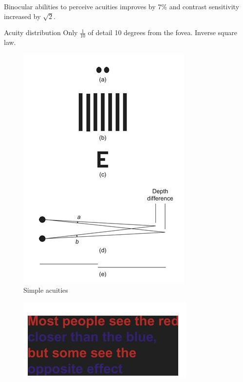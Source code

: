 \begin{mdframed}
\begin{multicols}{2}
\begin{compactdesc}
\item[Binocular abilities] to perceive acuities improves by 7\% and
    contrast sensitivity increased by $\sqrt 2$.
\item[Acuity distribution] Only $\frac{1}{10}$ of detail 10 degrees from the
    fovea. Inverse square law.
\end{compactdesc}
\end{multicols}
\end{mdframed}


\begin{mdframed}\begin{multicols}{3}
    \begin{figure}[H]
        \centering
        \includegraphics[width=0.7\linewidth]{acuities.png}
        \caption{Simple acuities}
    \end{figure}
    \begin{figure}[H]
        \centering
        \includegraphics[width=\linewidth]{red_or_blue_near.png}

\end{figure}
\end{multicols}
\end{mdframed}
